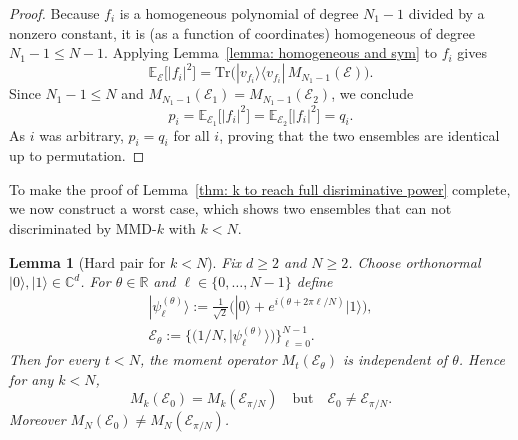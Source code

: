 \documentclass[aps,prx,reprint,superscriptaddress,amsmath,amssymb,longbibliography,floatfix]{revtex4-2}
\newcommand{\Abs}[1]{\left\lvert #1\right\rvert}
\providecommand{\ket}[1]{|#1 \rangle}
\providecommand{\ketbra}[2]{|#1\rangle \langle #2|}
\newcommand{\dsE}{\mathbb{E}}
\theoremstyle{plain}
\newtheorem{lemma}[theorem]{Lemma}
\theoremstyle{definition}
\theoremstyle{remark}
\begin{document}
\begin{proof}
Because $f_i$ is a homogeneous polynomial of degree $N_1-1$ divided by a nonzero constant,
it is (as a function of coordinates) homogeneous of degree $N_1-1\le N-1$.
Applying Lemma~\ref{lemma: homogeneous and sym} to $f_i$ gives
\[
\dsE_{\mathcal E}\!\big[\Abs{f_i}^2\big]
=
\mathrm{Tr}\!\Big(\ketbra{v_{f_i}}{v_{f_i}}\,M_{N_1-1}(\mathcal E)\Big).
\]
Since $N_1-1\le N$ and $M_{N_1-1}(\mathcal E_1)=M_{N_1-1}(\mathcal E_2)$, we conclude
\begin{equation}
p_i=\dsE_{\mathcal E_1}\!\big[\Abs{f_i}^2\big]
=\dsE_{\mathcal E_2}\!\big[\Abs{f_i}^2\big]
=q_i.
\label{eq:app-ensemble-weight-equality}
\end{equation}
As $i$ was arbitrary, $p_i=q_i$ for all $i$, proving that the two ensembles are identical up to permutation.
\end{proof}
To make the proof of Lemma~\ref{thm: k to reach full disriminative power} complete, we now construct a worst case, which shows two ensembles that can not discriminated by MMD-$k$ with $k<N$.
\begin{lemma}[Hard pair for $k<N$]\label{lem:hardpair}
Fix $d\ge 2$ and $N\ge 2$. Choose orthonormal $\ket{0},\ket{1}\in\mathbb C^d$. For $\theta\in\mathbb R$ and
$\ell\in\{0,\dots,N-1\}$ define
\begin{equation}
\begin{gathered}
\ket{\psi_\ell^{(\theta)}}:=\frac{1}{\sqrt2}\Big(\ket{0}+e^{i(\theta+2\pi\ell/N)}\ket{1}\Big),\\
\mathcal E_\theta:=\Big\{\big(1/N,\ket{\psi_\ell^{(\theta)}}\big)\Big\}_{\ell=0}^{N-1}.
\end{gathered}
\label{eq:app-phase-polygon-hard-pair}
\end{equation}
Then for every $t<N$, the moment operator $M_t(\mathcal E_\theta)$ is independent of $\theta$. Hence for any $k<N$,
\begin{equation}
M_k(\mathcal E_0)=M_k(\mathcal E_{\pi/N})\quad\text{but}\quad \mathcal E_0\neq \mathcal E_{\pi/N}.
\label{eq:app-hard-pair-moment-matching}
\end{equation}
Moreover $M_N(\mathcal E_0)\neq M_N(\mathcal E_{\pi/N})$.
\end{lemma}
\end{document}
